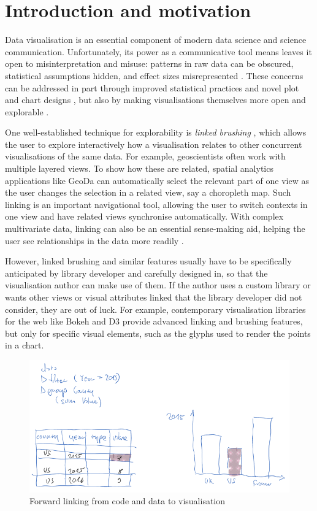 \section{Introduction and motivation}

Data visualisation is an essential component of modern data science and science
communication. Unfortunately, its power as a communicative tool means leaves it
open to misinterpretation and misuse: patterns in raw data can be obscured,
statistical assumptions hidden, and effect sizes misrepresented
\cite{weissgerber15}. These concerns can be addressed in part through improved
statistical practices and novel plot and chart designs \cite{allen19}, but also
by making visualisations themselves more open and explorable
\cite{dragicevic19}.

One well-established technique for explorability is \emph{linked brushing}
\cite{fisherkeller75,becker87,buja91}, which allows the user to explore
interactively how a visualisation relates to other concurrent visualisations of
the same data. For example, geoscientists often work with multiple layered
views. To show how these are related, spatial analytics applications like GeoDa
\cite{anselin06} can automatically select the relevant part of one view as the
user changes the selection in a related view, say a choropleth map. Such linking
is an important navigational tool, allowing the user to switch contexts in one
view and have related views synchronise automatically. With complex multivariate
data, linking can also be an essential sense-making aid, helping the user see
relationships in the data more readily \cite{he18}.

However, linked brushing and similar features usually have to be specifically
anticipated by library developer and carefully designed in, so that the
visualisation author can make use of them. If the author uses a custom library
or wants other views or visual attributes linked that the library developer did
not consider, they are out of luck. For example, contemporary visualisation
libraries for the web like Bokeh \cite{jolly18} and D3 \cite{bostock11} provide
advanced linking and brushing features, but only for specific visual elements,
such as the glyphs used to render the points in a chart.

\begin{figure}[h]
\includegraphics[scale=0.35]{image/chart-fwd}
\caption{Forward linking from code and data to visualisation}
\end{figure}

